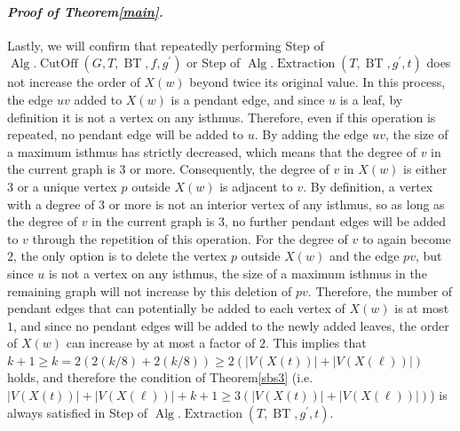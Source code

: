 \documentclass[letter,11pt]{article}
\newcommand{\white}{\qquad{\framebox{\rule{0pt}{4pt}}}}
\newcommand{\owari}{\hfill\white}
\theoremstyle{definition}
\theoremstyle{definition}
\DeclareMathOperator{\BT}{BT}
\DeclareMathOperator{\Alg}{Alg}
\DeclareMathOperator{\CutOff}{CutOff}
\DeclareMathOperator{\Extraction}{Extraction}
\newcommand{\1}{\boldmath$~1~$\unboldmath}
\newcommand{\qedgo}{\vspace{0.35cm}}
\newcommand{\tume}{\hspace*{0.2em}}
\newcommand{\maru}[1]{{\ooalign{\hfill$\small#1$\hfill\crcr\scalebox{1.3}{$\bigcirc$}}}}
\newenvironment{Proofof}[1]{\expandafter
\paragraph{{\it Proof of #1.}}}{\hspace{5mm}\owari\qedgo}
\begin{document}
\begin{Proofof}{Theorem\tume\ref{main}}
Lastly, we will confirm that repeatedly performing Step\tume\maru{\ref{hige}} of $\Alg.\CutOff(G,T,\BT,f,g^{\prime})$ or Step\tume\maru{\ref{hige2}} of $\Alg.\Extraction(T, \BT,g^{\prime},t)$ does not increase the order of $X(w)$ beyond twice its original value. In this process, the edge $uv$ added to $X(w)$ is a pendant edge, and since $u$ is a leaf, by definition it is not a vertex on any isthmus. Therefore, even if this operation is repeated, no pendant edge will be added to $u$. By adding the edge $uv$, the size of a maximum isthmus has strictly decreased, which means that the degree of $v$ in the current graph is $3$ or more. Consequently, the degree of $v$ in $X(w)$ is either $3$ or a unique vertex $p$ outside $X(w)$ is adjacent to $v$. By definition, a vertex with a degree of $3$ or more is not an interior vertex of any isthmus, so as long as the degree of $v$ in the current graph is $3$, no further pendant edges will be added to $v$ through the repetition of this operation. For the degree of $v$ to again become $2$, the only option is to delete the vertex $p$ outside $X(w)$ and the edge $pv$, but since $u$ is not a vertex on any isthmus, the size of a maximum isthmus in the remaining graph will not increase by this deletion of $pv$. Therefore, the number of pendant edges that can potentially be added to each vertex of $X(w)$ is at most $1$, and since no pendant edges will be added to the newly added leaves, the order of $X(w)$ can increase by at most a factor of $2$. This implies that $k + 1 \geq k=2(2(k/8)+2(k/8)) \geq 2(|V(X(t))| + |V(X(\ell))|)$ holds, and therefore the condition of Theorem\tume\ref{sbs3} (i.e. $|V(X(t))| + |V(X(\ell))| + k + 1 \geq 3(|V(X(t))| + |V(X(\ell))|)$) is always satisfied in Step\tume\maru{\ref{mini-puzzle-finish}} of $\Alg.\Extraction(T, \BT,g^{\prime},t)$. 

\end{Proofof}
\end{document}
